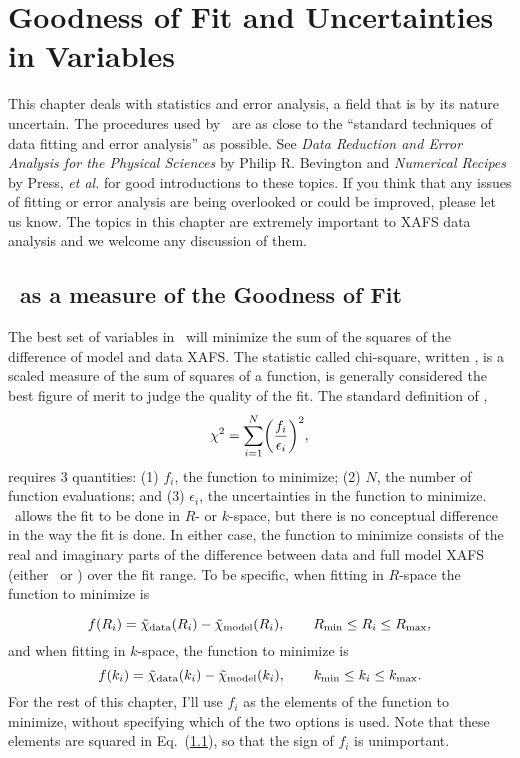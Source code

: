 \section{Goodness of Fit and Uncertainties in Variables}\label{ch:uncertain} 

This chapter deals with statistics and error analysis, a field that is
by its nature uncertain.  The procedures used by \feffit\ are as close
to the ``standard techniques of data fitting and error analysis'' as
possible.  See {\sl Data Reduction and Error Analysis for the Physical
Sciences} by Philip R. Bevington and {\sl Numerical Recipes} by Press,
{\it {et al.}\/} for good introductions to these topics.  If you think
that any issues of fitting or error analysis are being overlooked or
could be improved, please let us know.  The topics in this chapter are
extremely important to XAFS data analysis and we welcome any
discussion of them.

\subsection{\chisqr\ as a measure of the Goodness of Fit}

The best set of variables in \feffit\ will minimize the sum of the
squares of the difference of model and data XAFS.  The statistic
called chi-square, written \chisqr, is a scaled measure of the sum of
squares of a function, is generally considered the best figure of
merit to judge the quality of the fit.  The standard definition of
\chisqr, 
\begin{equation}
 \chi^2 = \sum_{i=1}^N \biggl( { {f_i} \over {\epsilon_i} } \biggr)^2,
\label{eq:chi2def}
\end{equation} 
\noindent requires 3 quantities: (1) $f_i$, the function to minimize; 
(2) $N$, the number of function evaluations; and (3) $\epsilon_i$, the
uncertainties in the function to minimize.  \feffit\ allows the fit to
be done in $R$- or $k$-space, but there is no conceptual difference in
the way the fit is done.  In either case, the function to minimize
consists of the real and imaginary parts of the difference between
data and full model XAFS (either \chir\ or \chiq) over the fit range.
To be specific, when fitting in $R$-space the function to minimize is

\begin{equation}
  f(R_i) = \tilde\chi_{\rm data}(R_i) 
         - \tilde\chi_{\rm model}(R_i),
                            \qquad R_{\rm min} \le R_i \le R_{\rm max},
\end{equation}
and when fitting in $k$-space, the function to minimize is
\begin{equation}
  f(k_i) = \tilde\chi_{\rm data}(k_i) 
         - \tilde\chi_{\rm model}(k_i),\qquad 
                           k_{\rm min} \le k_i \le k_{\rm max} .
\end{equation}
\noindent
For the rest of this chapter, I'll use $f_i$ as the elements of the
function to minimize, without specifying which of the two options is used.
Note that these elements are squared in Eq.~(\ref{}), so that the sign of
$f_i$ is unimportant.

